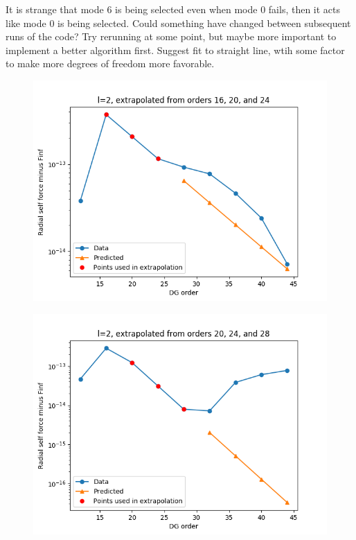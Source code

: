 \documentclass{article}
\begin{document}
It is strange that mode 6 is being selected even when mode 0 fails, then it acts like mode 0 is being selected. Could something have changed between subsequent runs of the code? Try rerunning at some point, but maybe more important to implement a better algorithm first. Suggest fit to straight line, wtih some factor to make more degrees of freedom more favorable. 

\begin{figure}
  \includegraphics{extrapolate7t632l2i1}
\end{figure}
\begin{figure}
  \includegraphics{extrapolate7t632l2i2}
\end{figure}
\end{document}
